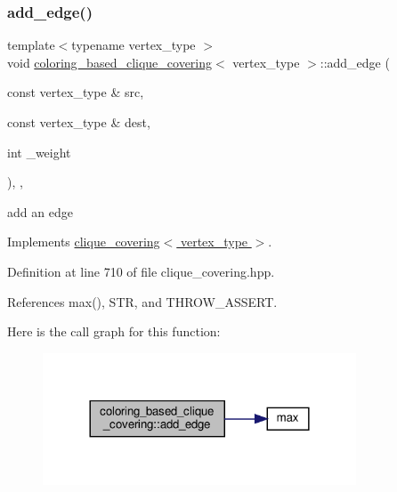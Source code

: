 \subsubsection{\texorpdfstring{add\+\_\+edge()}{add\_edge()}}
{\footnotesize\ttfamily template$<$typename vertex\+\_\+type $>$ \\
void \hyperlink{classcoloring__based__clique__covering}{coloring\+\_\+based\+\_\+clique\+\_\+covering}$<$ vertex\+\_\+type $>$\+::add\+\_\+edge (\begin{DoxyParamCaption}\item[{const vertex\+\_\+type \&}]{src,  }\item[{const vertex\+\_\+type \&}]{dest,  }\item[{int}]{\+\_\+weight }\end{DoxyParamCaption})\hspace{0.3cm}{\ttfamily [inline]}, {\ttfamily [override]}, {\ttfamily [virtual]}}



add an edge 



Implements \hyperlink{classclique__covering_ae8fc02dd0bdb4500dc24bf1fa88f00d4}{clique\+\_\+covering$<$ vertex\+\_\+type $>$}.



Definition at line 710 of file clique\+\_\+covering.\+hpp.



References max(), S\+TR, and T\+H\+R\+O\+W\+\_\+\+A\+S\+S\+E\+RT.

Here is the call graph for this function\+:
\nopagebreak
\begin{figure}[H]
\begin{center}
\leavevmode
\includegraphics[width=264pt]{dd/d09/classcoloring__based__clique__covering_a19be6c22f60eb2aa0c9914019cc134bf_cgraph}
\end{center}
\end{figure}
\mbox{\label{classcoloring__based__clique__covering_a4e3275c690b4dfb9ee16e66091beeccf}} 

